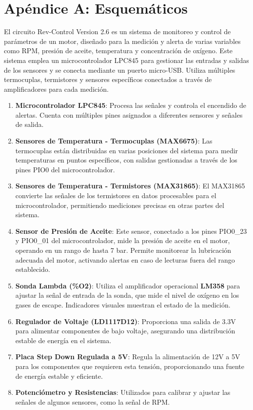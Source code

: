 \chapter{Apéndice A: Esquemáticos}
    El circuito Rev-Control Version 2.6 es un sistema de monitoreo y control de parámetros de un motor, diseñado para la medición y alerta de varias variables como RPM, presión de aceite, temperatura y concentración de oxígeno. Este sistema emplea un microcontrolador LPC845 para gestionar las entradas y salidas de los sensores y se conecta mediante un puerto micro-USB. Utiliza múltiples termocuplas, termistores y sensores específicos conectados a través de amplificadores para cada medición.\\

\begin{enumerate}
    \item \textbf{Microcontrolador LPC845}: Procesa las señales y controla el encendido de alertas. Cuenta con múltiples pines asignados a diferentes sensores y señales de salida.

    \item \textbf{Sensores de Temperatura - Termocuplas (MAX6675)}: Las termocuplas están distribuidas en varias posiciones del sistema para medir temperaturas en puntos específicos, con salidas gestionadas a través de los pines PIO0 del microcontrolador.

    \item \textbf{Sensores de Temperatura - Termistores (MAX31865)}: El MAX31865 convierte las señales de los termistores en datos procesables para el microcontrolador, permitiendo mediciones precisas en otras partes del sistema.

    \item \textbf{Sensor de Presión de Aceite}: Este sensor, conectado a los pines PIO0\_23 y PIO0\_01 del microcontrolador, mide la presión de aceite en el motor, operando en un rango de hasta 7 bar. Permite monitorear la lubricación adecuada del motor, activando alertas en caso de lecturas fuera del rango establecido.

    \item \textbf{Sonda Lambda (\%O2)}: Utiliza el amplificador operacional \textbf{LM358} para ajustar la señal de entrada de la sonda, que mide el nivel de oxígeno en los gases de escape. Indicadores visuales muestran el estado de la medición.

    \item \textbf{Regulador de Voltaje (LD1117D12)}: Proporciona una salida de 3.3V para alimentar componentes de bajo voltaje, asegurando una distribución estable de energía en el sistema.

    \item \textbf{Placa Step Down Regulada a 5V}: Regula la alimentación de 12V a 5V para los componentes que requieren esta tensión, proporcionando una fuente de energía estable y eficiente.

    \item \textbf{Potenciómetro y Resistencias}: Utilizados para calibrar y ajustar las señales de algunos sensores, como la señal de RPM.
\end{enumerate}



